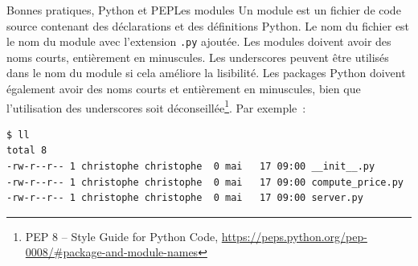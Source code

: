 \documentclass{beamer}
\begin{document}
    \begin{frame}[fragile]{Bonnes pratiques, Python et PEP}{Les modules}
        Un module est un fichier de code source contenant des déclarations et des définitions Python. Le nom du fichier est le nom du module avec l'extension \lstinline{.py} ajoutée.
        \bigbreak
        Les modules doivent avoir des noms courts, entièrement en minuscules. Les underscores peuvent être utilisés dans le nom du module si cela améliore la lisibilité.
        Les packages Python doivent également avoir des noms courts et entièrement en minuscules, bien que l’utilisation des underscores soit déconseillée\footnote{PEP 8 – Style Guide for Python Code, \url{https://peps.python.org/pep-0008/\#package-and-module-names}}.
        \bigbreak
        Par exemple~:
        \begin{lstlisting}[language=Bash]
$ ll
total 8
-rw-r--r-- 1 christophe christophe  0 mai   17 09:00 __init__.py
-rw-r--r-- 1 christophe christophe  0 mai   17 09:00 compute_price.py
-rw-r--r-- 1 christophe christophe  0 mai   17 09:00 server.py
        \end{lstlisting}
    \end{frame}
\end{document}
